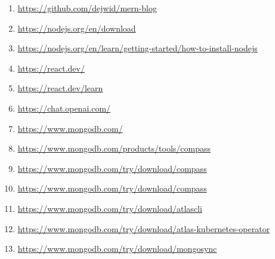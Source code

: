 \documentclass[12pt]{article}
\begin{document}
\begin{enumerate}[label=\arabic*.,itemsep=0pt,parsep=0pt]
      \item \url{https://github.com/dejwid/mern-blog}
      \item \url{https://nodejs.org/en/download}
      \item \url{https://nodejs.org/en/learn/getting-started/how-to-install-nodejs}
      \item \url{https://react.dev/}
      \item \url{https://react.dev/learn}
      \item \url{https://chat.openai.com/}
      \item \url{https://www.mongodb.com/}
      \item \url{https://www.mongodb.com/products/tools/compass}
      \item \url{https://www.mongodb.com/try/download/compass}
      \item \url{https://www.mongodb.com/try/download/compass}
      \item \url{https://www.mongodb.com/try/download/atlascli}
      \item \url{https://www.mongodb.com/try/download/atlas-kubernetes-operator}
      \item \url{https://www.mongodb.com/try/download/mongosync}
    
    
\end{enumerate}


\clearpage

\listoffigures

\clearpage
\end{document}
